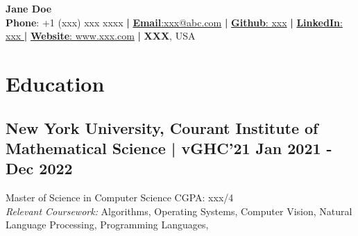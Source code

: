 \documentclass[a4,10pt]{article}
\newcommand{\hskills}[1]{
\textbf{\bfseries #1} }
\begin{document}
\begin{center}
   
 
            \centering
            \hspace{0.2cm}
            \textbf{{\LARGE Jane Doe}} \\ %
            \vspace{0.2cm}
            \hspace {0.15cm} \textbf{Phone}: +1 (xxx) xxx xxxx \textbf{|} 
          \href{mailto:xxx@abc.com}{\textbf{Email}:xxx@abc.com} \textbf{|} 
            \href{https://github.com/xxx}{\textbf{Github}: xxx} \textbf{|} 
            \href{https://www.linkedin.com/in/xxx/}{\textbf{LinkedIn}: xxx } \textbf{|} 
            \href{https://xxx.github.io}{\textbf{Website}: www.xxx.com} \textbf{|} \textbf{XXX}, USA
           
   
    
\vspace{-0.15cm} 
\end{center}

\section{Education }
\subsection*{New York University, Courant Institute of Mathematical Science | vGHC'21  \hfill Jan 2021  - Dec 2022} 
{Master of Science in Computer Science  \hfill{CGPA: xxx/4}} \\
 \textit{Relevant Coursework:}  Algorithms, Operating Systems, Computer Vision, Natural Language Processing, Programming Languages, 
\end{document}
